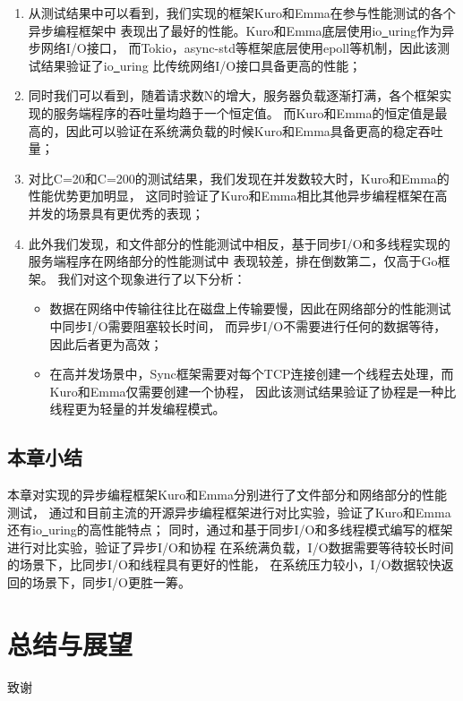 \documentclass[supercite]{HustGraduPaper}
\theoremstyle{definition}
\begin{document}
\begin{enumerate}
  \item 从测试结果中可以看到，我们实现的框架Kuro和Emma在参与性能测试的各个异步编程框架中
    表现出了最好的性能。Kuro和Emma底层使用io\underline{~}uring作为异步网络I/O接口，
    而Tokio，async-std等框架底层使用epoll等机制，因此该测试结果验证了io\underline{~}uring
    比传统网络I/O接口具备更高的性能；
  \item 同时我们可以看到，随着请求数N的增大，服务器负载逐渐打满，各个框架实现的服务端程序的吞吐量均趋于一个恒定值。
    而Kuro和Emma的恒定值是最高的，因此可以验证在系统满负载的时候Kuro和Emma具备更高的稳定吞吐量；
  \item 对比C=20和C=200的测试结果，我们发现在并发数较大时，Kuro和Emma的性能优势更加明显，
    这同时验证了Kuro和Emma相比其他异步编程框架在高并发的场景具有更优秀的表现；
  \item 此外我们发现，和文件部分的性能测试中相反，基于同步I/O和多线程实现的服务端程序在网络部分的性能测试中
    表现较差，排在倒数第二，仅高于Go框架。
    我们对这个现象进行了以下分析：
    \begin{itemize}
      \item 数据在网络中传输往往比在磁盘上传输要慢，因此在网络部分的性能测试中同步I/O需要阻塞较长时间，
        而异步I/O不需要进行任何的数据等待，因此后者更为高效；
      \item 在高并发场景中，Sync框架需要对每个TCP连接创建一个线程去处理，而Kuro和Emma仅需要创建一个协程，
        因此该测试结果验证了协程是一种比线程更为轻量的并发编程模式。
    \end{itemize}
\end{enumerate}

\subsection{本章小结}
本章对实现的异步编程框架Kuro和Emma分别进行了文件部分和网络部分的性能测试，
通过和目前主流的开源异步编程框架进行对比实验，验证了Kuro和Emma还有io\underline{~}uring的高性能特点；
同时，通过和基于同步I/O和多线程模式编写的框架进行对比实验，验证了异步I/O和协程
在系统满负载，I/O数据需要等待较长时间的场景下，比同步I/O和线程具有更好的性能，
在系统压力较小，I/O数据较快返回的场景下，同步I/O更胜一筹。\par

\section{总结与展望}

\begin{thankpage}

致谢

\end{thankpage}

\nocite{*}


\end{document}
